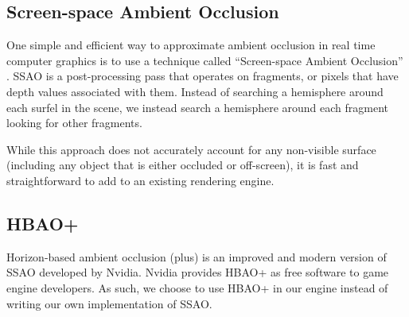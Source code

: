 \subsection{Screen-space Ambient Occlusion}

One simple and efficient way to approximate ambient occlusion in real time computer graphics is to use a technique called ``Screen-space Ambient Occlusion'' \cite{ssao}.
SSAO is a post-processing pass that operates on fragments, or pixels that have depth values associated with them.
Instead of searching a hemisphere around each surfel in the scene, we instead search a hemisphere around each fragment looking for other fragments.

While this approach does not accurately account for any non-visible surface (including any object that is either occluded or off-screen), it is fast and straightforward to add to an existing rendering engine.


\subsection{HBAO+}

Horizon-based ambient occlusion (plus) is an improved and modern version of SSAO developed by Nvidia.
Nvidia provides HBAO+ as free software to game engine developers.
As such, we choose to use HBAO+ in our engine instead of writing our own implementation of SSAO.
